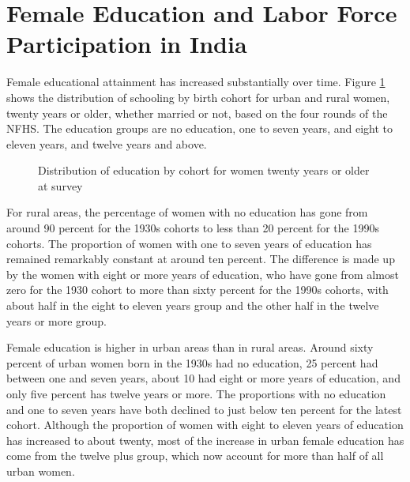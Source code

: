 \documentclass[12pt,letterpaper]{article}
\begin{document}

\section{Female Education and Labor Force Participation in India}

Female educational attainment has increased substantially over time.
Figure \ref{fig:education_over_time} shows the distribution of schooling by birth 
cohort for urban and rural women, 
twenty years or older, whether married or not, based on the four rounds of the NFHS.
The education groups are no education, one to seven years, and eight to eleven years,
and twelve years and above.

\begin{figure}[htpb]
\centering
{} 
\caption{Distribution of education by cohort for women twenty years or older at survey}
\label{fig:education_over_time}
\end{figure}


For rural areas, the percentage of women with no education has gone from around 90 percent
for the 1930s cohorts to less than 20 percent for the 1990s cohorts. 
The proportion of women with one to seven years of education has remained remarkably
constant at around ten percent.
The difference is made up by the women with eight or more years of education, who have
gone from almost zero for the 1930 cohort to more than sixty percent for the 1990s cohorts,
with about half in the eight to eleven years group and 
the other half in the twelve years or more group.

Female education is higher in urban areas than in rural areas.
Around sixty percent of urban women born in the 1930s had no education, 25 percent had
between one and seven years, about 10 had eight or more years of education, and only
five percent has twelve years or more.
The proportions with no education and one to seven years have both declined to just below 
ten percent for the latest cohort.
Although the proportion of women with eight to eleven years of education has increased
to about twenty, most of the increase in urban female education has come from the 
twelve plus group, which now account for more than half of all urban women.
\end{document}
